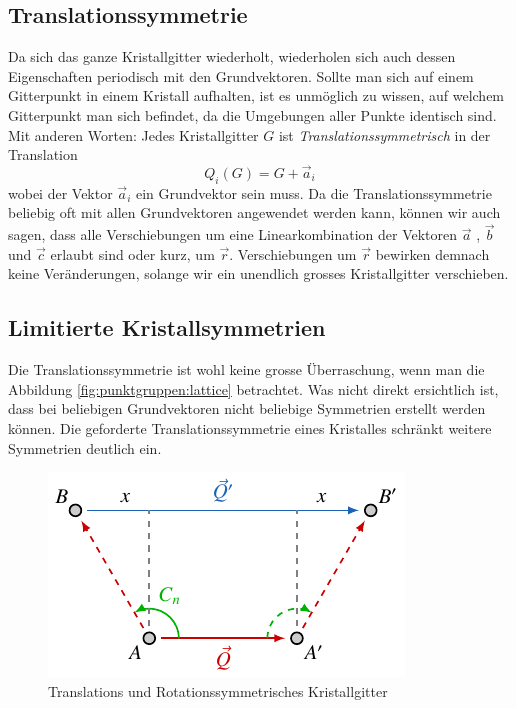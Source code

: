 
\subsection{Translationssymmetrie} 
Da sich das ganze Kristallgitter wiederholt, wiederholen sich auch dessen Eigenschaften periodisch mit den Grundvektoren.
Sollte man sich auf einem Gitterpunkt in einem Kristall aufhalten, ist es unmöglich zu wissen, auf welchem Gitterpunkt man sich befindet, 
da die Umgebungen aller Punkte identisch sind. 
Mit anderen Worten: Jedes Kristallgitter $ G $ ist \emph{Translationssymmetrisch} in der Translation 
\[
    Q_i(G) = G + \vec{a}_i
\] wobei der Vektor $\vec{a}_i$ ein Grundvektor sein muss.
Da die Translationssymmetrie beliebig oft mit allen Grundvektoren angewendet werden kann, 
können wir auch sagen, dass alle Verschiebungen um eine Linearkombination 
der Vektoren $\vec{a}$ , $\vec{b}$ und $\vec{c}$ erlaubt sind oder kurz, um $\vec{r}$. 
Verschiebungen um $\vec{r}$ bewirken demnach keine Veränderungen, 
solange wir ein unendlich grosses Kristallgitter verschieben.

\subsection{Limitierte Kristallsymmetrien} \label{txt:punktgruppen: Translationssymmetrie}
 Die Translationssymmetrie ist wohl keine grosse Überraschung, wenn man die Abbildung \ref{fig:punktgruppen:lattice} betrachtet.
 Was nicht direkt ersichtlich ist, dass bei beliebigen Grundvektoren nicht beliebige Symmetrien erstellt werden können.
 Die geforderte Translationssymmetrie eines Kristalles schränkt weitere Symmetrien deutlich ein.
  
\begin{figure}
    \centering
    \includegraphics[]{papers/punktgruppen/figures/combine-symmetries}
    \caption{
        Translations und Rotationssymmetrisches Kristallgitter
    }
    \label{fig:punktgruppen:rot-geometry}
\end{figure}

